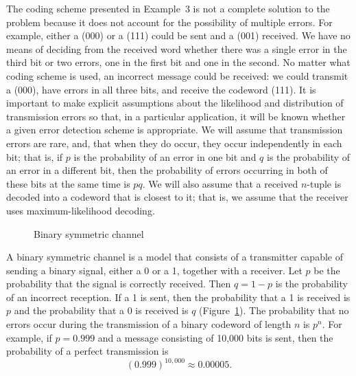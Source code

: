  
The coding scheme presented in Example~3 is not a complete solution to
the problem because it does not account for the possibility of
multiple errors. For example, either a (000) or a (111) could be sent
and a (001) received. We have no means of deciding from the received
word whether there was a single error in the third bit or two errors,
one in the first bit and one in the second.  No matter what coding 
scheme is used, an incorrect message could
be received: we could transmit a (000), have errors in all three
bits, and receive the codeword (111). It is important to make explicit
assumptions about the likelihood and distribution of transmission
errors so that, in a particular application, it will be known whether
a given
error detection scheme is appropriate. We will assume that
transmission errors are rare, and, that when they do occur, they occur
independently in each bit; that is, if $p$ is the probability of an
error in one bit and $q$ is the probability of an error in a different
bit, then the probability of errors occurring in both of these bits at
the same time is $pq$. We will also assume that a received $n$-tuple 
is
decoded into a codeword that is closest to it; that is, we assume that
the receiver uses {\bfi maximum-likelihood
decoding}.
 
 
\begin{figure}[htb]  %
\begin{center}


\end{center}
\caption{Binary symmetric channel}
\label{channel}
\end{figure}
 
 
 
A {\bfi binary symmetric channel\/}
is a model that consists of a transmitter capable of sending a binary 
signal, either a 0 or a 1, together with a receiver. Let $p$ be the 
probability that the signal is correctly
received. Then $q=1-p$ is the probability of an incorrect reception.
If a 1 is sent, then the probability that a 1 is received is $p$ and
the probability that a 0 is received is $q$ (Figure~\ref{channel}).
The probability that no errors occur during the transmission of a binary
codeword of length $n$ is $p^{n}$. For example, if $p=0.999$ and a
message consisting of 10,000 bits is sent, then the probability of a
perfect transmission is 
\[
(0.999)^{10,000} \approx 0.00005.
\]
 
